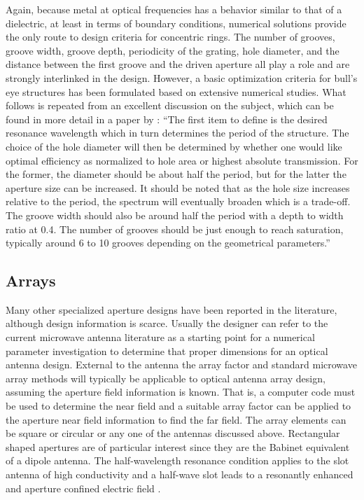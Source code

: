\documentclass[11pt]{article}
\begin{document}
Again, because metal at optical frequencies has a behavior similar to that of a dielectric, at least in terms of boundary conditions, numerical solutions provide the only route to design criteria for concentric rings. The number of grooves, groove width, groove depth, periodicity of the grating, hole diameter, and the distance between the first groove and the driven aperture all play a role and are strongly interlinked in the design. However, a basic optimization criteria for bull's eye structures has been formulated based on extensive numerical studies. What follows is repeated from an excellent discussion on the subject, which can be found in more detail in a paper by \cite{Mahboub2010}: ``The first item to define is the desired resonance wavelength which in turn determines the period of the structure. The choice of the hole diameter will then be determined by whether one would like optimal efficiency as normalized to hole area or highest absolute transmission. For the former, the diameter should be about half the period, but for the latter the aperture size can be increased. It should be noted that as the hole size increases relative to the period, the spectrum will eventually broaden which is a trade-off. The groove width should also be around half the period with a depth to width ratio at 0.4. The number of grooves should be just enough to reach saturation, typically around 6 to 10 grooves depending on the geometrical parameters.''
\subsection{Arrays}
%
Many other specialized aperture designs have been reported in the literature, although design information is scarce. Usually the designer can refer to the current microwave antenna literature as a starting point for a numerical parameter investigation to determine that proper dimensions for an optical antenna design. External to the antenna the array factor and standard microwave array methods will typically be applicable to optical antenna array design, assuming the aperture field information is known. That is, a computer code must be used to determine the near field and a suitable array factor can be applied to the aperture near field information to find the far field. The array elements can be square or circular or any one of the antennas discussed above. Rectangular shaped apertures are of particular interest since they are the Babinet equivalent of a dipole antenna. The half-wavelength resonance condition applies to the slot antenna of high conductivity and a half-wave slot leads to
a resonantly enhanced and aperture confined electric field \cite{Park2009}.
\end{document}
